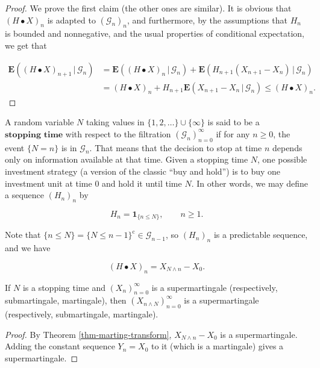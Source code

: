 \begin{proof}
We prove the first claim (the other ones are
similar). It is obvious that $(H\bullet X)_n$ is
adapted to $(\mathcal{G}_n)_n$, and furthermore, by
the assumptions that $H_n$ is bounded and
nonnegative, and the usual properties of conditional
expectation, we get that

\begin{align*}
\mathbf{E}\left((H\bullet X)_{n+1}\,|\,\mathcal{G}_n\right) &=
\mathbf{E}\left((H\bullet X)_{n}\,|\,\mathcal{G}_n\right) +
\mathbf{E}\left(H_{n+1}(X_{n+1}-X_n)\,|\,\mathcal{G}_n\right) \\
&= (H\bullet X)_n +
H_{n+1} \mathbf{E}\left(X_{n+1}-X_n\,|\,\mathcal{G}_n\right) \le (H\bullet X)_n.
\end{align*}

\end{proof}

\noindent A random variable $N$ taking values in
$\{1,2,\ldots\}\cup \{\infty\}$ is said to be a
$\textbf{stopping time}$ with respect to the
filtration $(\mathcal{G}_n)_{n=0}^\infty$ if for any
$n\ge0$, the event $\{ N=n \}$ is in $\mathcal{G}_n$.
That means that the decision to stop at time $n$
depends only on information available at that time.
Given a stopping time $N$, one possible investment
strategy (a version of the classic ``buy and hold'')
is to buy one investment unit at time $0$ and hold it
until time $N$. In other words, we may define a
sequence $(H_n)_n$ by

\[
H_n = \mathbf{1}_{\{n\le N\}}, \qquad n\ge 1.
\]

\noindent Note that
$\{ n\le N\} = \{N\le n-1\}^\textrm{c} \in
\mathcal{G}_{n-1}$,
so $(H_n)_n$ is a predictable sequence, and we have

\[
(H\bullet X)_n = X_{N\wedge n} - X_0.
\]

\begin{thm}
\label{thm-stopping-mart}
If $N$ is a stopping time and $(X_n)_{n=0}^\infty$ is
a supermartingale (respectively, submartingale,
martingale), then $(X_{n\wedge N})_{n=0}^\infty$ is a
supermartingale (respectively, submartingale,
martingale).
\end{thm}

\begin{proof}
By Theorem \ref{thm-marting-transform},
$X_{N\wedge n} - X_0$ is a supermartingale. Adding
the constant sequence $Y_n=X_0$ to it (which is a
martingale) gives a supermartingale.
\end{proof}

